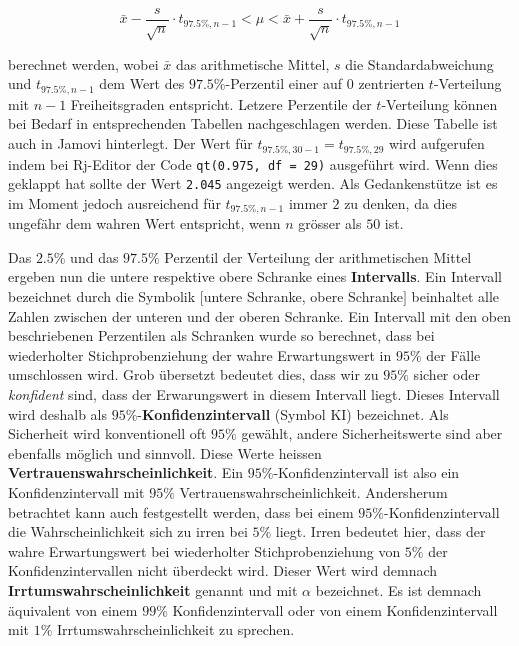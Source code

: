 \documentclass[
]{book}
\theoremstyle{definition}
\theoremstyle{definition}
\theoremstyle{definition}
\theoremstyle{definition}
\theoremstyle{remark}
\begin{document}
\begin{equation}
\bar{x} - \frac{s}{\sqrt{n}} \cdot t_{97.5\%, n-1} < \mu < \bar{x} + \frac{s}{\sqrt{n}} \cdot t_{97.5\%, n-1}\label{eq:ki-mean}
\end{equation}

berechnet werden, wobei \(\bar{x}\) das arithmetische Mittel, \(s\) die Standardabweichung und \(t_{97.5\%, n-1}\) dem Wert des \(97.5\%\)-Perzentil einer auf \(0\) zentrierten \(t\)-Verteilung mit \(n-1\) Freiheitsgraden entspricht. Letzere Perzentile der \(t\)-Verteilung können bei Bedarf in entsprechenden Tabellen nachgeschlagen werden. Diese Tabelle ist auch in Jamovi hinterlegt. Der Wert für \(t_{97.5\%, 30-1}=t_{97.5\%, 29}\) wird aufgerufen indem bei Rj-Editor der Code \texttt{qt(0.975,\ df\ =\ 29)} ausgeführt wird. Wenn dies geklappt hat sollte der Wert \texttt{2.045} angezeigt werden. Als Gedankenstütze ist es im Moment jedoch ausreichend für \(t_{97.5\%, n-1}\) immer \(2\) zu denken, da dies ungefähr dem wahren Wert entspricht, wenn \(n\) grösser als \(50\) ist.

Das \(2.5\%\) und das \(97.5\%\) Perzentil der Verteilung der arithmetischen Mittel ergeben nun die untere respektive obere Schranke eines \label{customdef-interval}{\textbf{Intervalls}. Ein Intervall bezeichnet durch die Symbolik \([\)untere Schranke, obere Schranke\(]\) beinhaltet alle Zahlen zwischen der unteren und der oberen Schranke.} \label{customdef-confidence-interval}{Ein Intervall mit den oben beschriebenen Perzentilen als Schranken wurde so berechnet, dass bei wiederholter Stichprobenziehung der wahre Erwartungswert in \(95\%\) der Fälle umschlossen wird. Grob übersetzt bedeutet dies, dass wir zu \(95\%\) sicher oder \emph{konfident} sind, dass der Erwarungswert in diesem Intervall liegt. Dieses Intervall wird deshalb als \(95\%\)-\textbf{Konfidenzintervall} (Symbol KI) bezeichnet.}
\label{customdef-confidence-level}{Als Sicherheit wird konventionell oft \(95\%\) gewählt, andere Sicherheitswerte sind aber ebenfalls möglich und sinnvoll. Diese Werte heissen \textbf{Vertrauenswahrscheinlichkeit}. Ein \(95\%\)-Konfidenzintervall ist also ein Konfidenzintervall mit \(95\%\) Vertrauenswahrscheinlichkeit.} \label{customdef-erring-level}{Andersherum betrachtet kann auch festgestellt werden, dass bei einem \(95\%\)-Konfidenzintervall die Wahrscheinlichkeit sich zu irren bei \(5\%\) liegt. Irren bedeutet hier, dass der wahre Erwartungswert bei wiederholter Stichprobenziehung von \(5\%\) der Konfidenzintervallen nicht überdeckt wird. Dieser Wert wird demnach \textbf{Irrtumswahrscheinlichkeit} genannt und mit \(\alpha\) bezeichnet}. Es ist demnach äquivalent von einem \(99\%\) Konfidenzintervall oder von einem Konfidenzintervall mit \(1\%\) Irrtumswahrscheinlichkeit zu sprechen.
\end{document}
